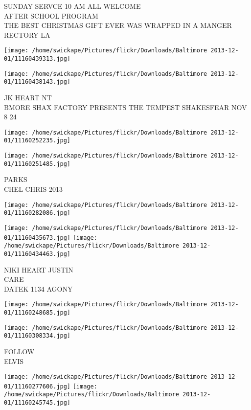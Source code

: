\documentclass[10pt,letterpaper]{article}
\begin{document}
SUNDAY SERVCE 10 AM ALL WELCOME\\
AFTER SCHOOL PROGRAM\\
THE BEST CHRISTMAS GIFT EVER WAS WRAPPED IN A MANGER\\
RECTORY LA
\pagebreak

\texttt{[image: /home/swickape/Pictures/flickr/Downloads/Baltimore 2013-12-01/11160439313.jpg]}

\vspace{0.25in}
\texttt{[image: /home/swickape/Pictures/flickr/Downloads/Baltimore 2013-12-01/11160438143.jpg]}

JK HEART NT\\
BMORE SHAX FACTORY PRESENTS THE TEMPEST SHAKESFEAR NOV 8 24
\pagebreak

\texttt{[image: /home/swickape/Pictures/flickr/Downloads/Baltimore 2013-12-01/11160252235.jpg]}

\vspace{0.25in}
\texttt{[image: /home/swickape/Pictures/flickr/Downloads/Baltimore 2013-12-01/11160251485.jpg]}

PARKS\\
CHEL CHRIS 2013
\pagebreak

\texttt{[image: /home/swickape/Pictures/flickr/Downloads/Baltimore 2013-12-01/11160282086.jpg]}

\vspace{0.25in}
\texttt{[image: /home/swickape/Pictures/flickr/Downloads/Baltimore 2013-12-01/11160435673.jpg]}
\texttt{[image: /home/swickape/Pictures/flickr/Downloads/Baltimore 2013-12-01/11160434463.jpg]}

NIKI HEART JUSTIN\\
CARE\\
DATEK 1134 AGONY
\pagebreak

\texttt{[image: /home/swickape/Pictures/flickr/Downloads/Baltimore 2013-12-01/11160248685.jpg]}

\vspace{0.25in}
\texttt{[image: /home/swickape/Pictures/flickr/Downloads/Baltimore 2013-12-01/11160308334.jpg]}

FOLLOW\\
ELVIS
\pagebreak

\texttt{[image: /home/swickape/Pictures/flickr/Downloads/Baltimore 2013-12-01/11160277606.jpg]}
\texttt{[image: /home/swickape/Pictures/flickr/Downloads/Baltimore 2013-12-01/11160245745.jpg]}
\end{document}
